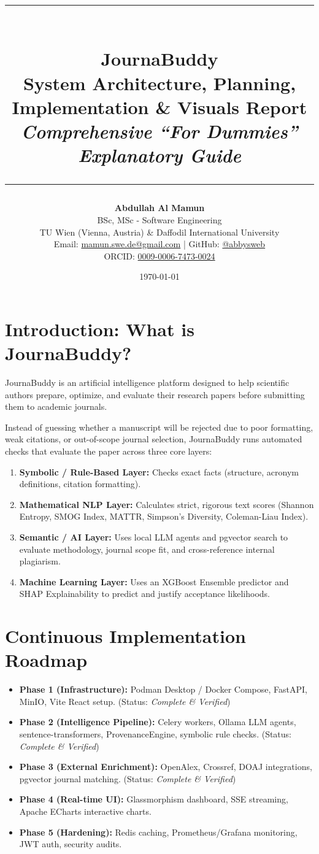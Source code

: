 \documentclass[11pt,a4paper]{article}
\title{
    \vspace{-1cm}
    \rule{\linewidth}{1.5pt}\\[0.4cm]
    {\Huge \textbf{\textsf{JournaBuddy}}}\\[0.2cm]
    {\Large \textbf{\textsf{System Architecture, Planning, Implementation \& Visuals Report}}}\\[0.3cm]
    {\large \textit{Comprehensive ``For Dummies'' Explanatory Guide}}\\[0.2cm]
    \rule{\linewidth}{0.8pt}
}
\author{
    \textbf{Abdullah Al Mamun}\\
    \small BSc, MSc - Software Engineering\\
    \small TU Wien (Vienna, Austria) \& Daffodil International University\\
    \small Email: \href{mailto:mamun.swe.de@gmail.com}{mamun.swe.de@gmail.com} | GitHub: \href{https://github.com/abbysweb}{@abbysweb}\\
    \small ORCID: \href{https://orcid.org/0009-0006-7473-0024}{0009-0006-7473-0024}
}
\date{\today}
\begin{document}
\maketitle
\tableofcontents
\newpage

\section{Introduction: What is JournaBuddy?}
JournaBuddy is an artificial intelligence platform designed to help scientific authors prepare, optimize, and evaluate their research papers before submitting them to academic journals. 

Instead of guessing whether a manuscript will be rejected due to poor formatting, weak citations, or out-of-scope journal selection, JournaBuddy runs automated checks that evaluate the paper across three core layers:
\begin{enumerate}[leftmargin=*]
    \item \textbf{Symbolic / Rule-Based Layer:} Checks exact facts (structure, acronym definitions, citation formatting).
    \item \textbf{Mathematical NLP Layer:} Calculates strict, rigorous text scores (Shannon Entropy, SMOG Index, MATTR, Simpson's Diversity, Coleman-Liau Index).
    \item \textbf{Semantic / AI Layer:} Uses local LLM agents and pgvector search to evaluate methodology, journal scope fit, and cross-reference internal plagiarism.
    \item \textbf{Machine Learning Layer:} Uses an XGBoost Ensemble predictor and SHAP Explainability to predict and justify acceptance likelihoods.
\end{enumerate}

\bigskip

\section{Continuous Implementation Roadmap}

\begin{itemize}[leftmargin=*]
    \item \textbf{Phase 1 (Infrastructure):} Podman Desktop / Docker Compose, FastAPI, MinIO, Vite React setup. (Status: \textit{Complete \& Verified})
    \item \textbf{Phase 2 (Intelligence Pipeline):} Celery workers, Ollama LLM agents, sentence-transformers, ProvenanceEngine, symbolic rule checks. (Status: \textit{Complete \& Verified})
    \item \textbf{Phase 3 (External Enrichment):} OpenAlex, Crossref, DOAJ integrations, pgvector journal matching. (Status: \textit{Complete \& Verified})
    \item \textbf{Phase 4 (Real-time UI):} Glassmorphism dashboard, SSE streaming, Apache ECharts interactive charts.
    \item \textbf{Phase 5 (Hardening):} Redis caching, Prometheus/Grafana monitoring, JWT auth, security audits.
\end{itemize}
\end{document}
